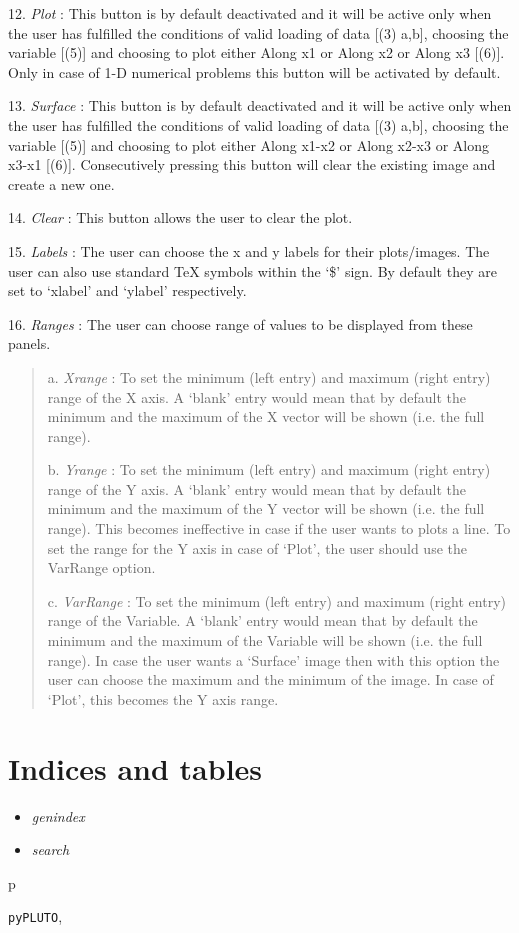 \documentclass[letterpaper,10pt,english]{sphinxmanual}
\begin{document}
12. \emph{Plot} : This button is by default deactivated and it will be active only when the user has fulfilled the conditions of valid
loading of data {[}(3) a,b{]}, choosing the variable {[}(5){]} and choosing to
plot either Along x1 or Along x2 or Along x3 {[}(6){]}.  Only in case of
1-D numerical problems this button will be activated by default.

13. \emph{Surface} : This button is by default deactivated and it will be
active only when the user has fulfilled the conditions of valid
loading of data {[}(3) a,b{]}, choosing the variable {[}(5){]} and choosing to
plot either Along x1-x2 or Along x2-x3 or Along x3-x1
{[}(6){]}. Consecutively pressing this button will clear the existing
image and create a new one.

14. \emph{Clear} : This button allows the user to
clear the plot.

15. \emph{Labels} : The user can choose the x and y labels for
their plots/images. The user can also use standard TeX symbols within
the `\$' sign. By default they are set to `xlabel' and `ylabel' respectively.

16. \emph{Ranges} : The user can choose range of values to be displayed
from these panels.
\begin{quote}

a. \emph{Xrange} : To set the minimum (left entry) and maximum (right
entry) range of the X axis. A `blank' entry would mean that by
default the minimum and the maximum of the X vector will be shown (i.e. the full range).

b. \emph{Yrange} : To set the minimum (left entry) and maximum (right
entry) range of the Y axis. A `blank' entry would mean that by default the minimum and the maximum of the Y
vector will be shown (i.e. the full range). This becomes
ineffective in case if the user wants to plots a line. To set the
range for the Y axis in case of `Plot', the user should use the
VarRange option.

c. \emph{VarRange} : To set the minimum (left entry) and maximum
(right entry) range of the Variable. A `blank' entry
would mean that by default the minimum and the maximum of the Variable
will be shown (i.e. the full range). In case the user wants a
`Surface' image then with this option the user can choose the
maximum and the minimum of the image. In case of `Plot', this
becomes the Y axis range.
\end{quote}


\chapter{Indices and tables}
\label{index:indices-and-tables}\begin{itemize}
\item {} 
\emph{genindex}

\item {} 
\emph{search}

\end{itemize}


\renewcommand{\indexname}{Python Module Index}
\begin{theindex}
\def\bigletter#1{{\Large\sffamily#1}\nopagebreak\vspace{1mm}}
\bigletter{p}
\item {\texttt{pyPLUTO}}, \pageref{index:module-pyPLUTO}
\end{theindex}

\renewcommand{\indexname}{Index}
\printindex
\end{document}
